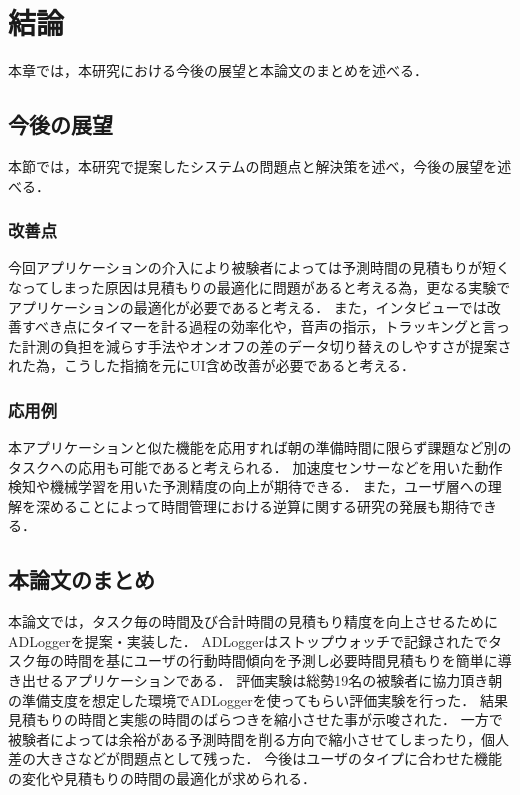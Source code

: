 \chapter{結論}
本章では，本研究における今後の展望と本論文のまとめを述べる．
\section{今後の展望}
本節では，本研究で提案したシステムの問題点と解決策を述べ，今後の展望を述べる．

\subsection{改善点}
今回アプリケーションの介入により被験者によっては予測時間の見積もりが短くなってしまった原因は見積もりの最適化に問題があると考える為，更なる実験でアプリケーションの最適化が必要であると考える．
また，インタビューでは改善すべき点にタイマーを計る過程の効率化や，音声の指示，トラッキングと言った計測の負担を減らす手法やオンオフの差のデータ切り替えのしやすさが提案された為，こうした指摘を元にUI含め改善が必要であると考える．
\subsection{応用例}
本アプリケーションと似た機能を応用すれば朝の準備時間に限らず課題など別のタスクへの応用も可能であると考えられる．
加速度センサーなどを用いた動作検知や機械学習を用いた予測精度の向上が期待できる．
また，ユーザ層への理解を深めることによって時間管理における逆算に関する研究の発展も期待できる．
\section{本論文のまとめ}
本論文では，タスク毎の時間及び合計時間の見積もり精度を向上させるためにADLoggerを提案・実装した．
ADLoggerはストップウォッチで記録されたでタスク毎の時間を基にユーザの行動時間傾向を予測し必要時間見積もりを簡単に導き出せるアプリケーションである．
評価実験は総勢19名の被験者に協力頂き朝の準備支度を想定した環境でADLoggerを使ってもらい評価実験を行った．
結果見積もりの時間と実態の時間のばらつきを縮小させた事が示唆された．
一方で被験者によっては余裕がある予測時間を削る方向で縮小させてしまったり，個人差の大きさなどが問題点として残った．
今後はユーザのタイプに合わせた機能の変化や見積もりの時間の最適化が求められる．